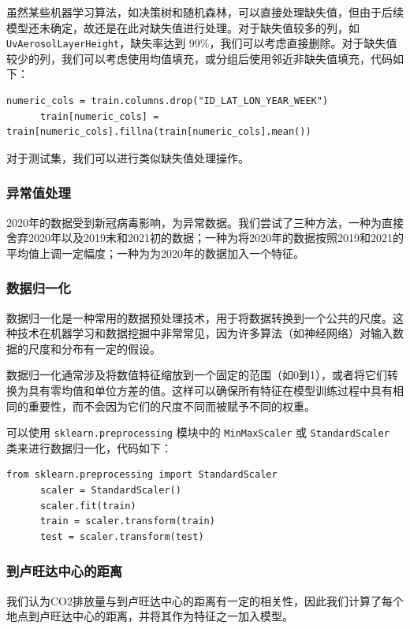 \documentclass{ctexart}
\begin{document}
虽然某些机器学习算法，如决策树和随机森林，可以直接处理缺失值，但由于后续模型还未确定，故还是在此对缺失值进行处理。对于缺失值较多的列，如 \texttt{UvAerosolLayerHeight}，缺失率达到 99\%，我们可以考虑直接删除。对于缺失值较少的列，我们可以考虑使用均值填充，或分组后使用邻近非缺失值填充，代码如下：

\begin{lstlisting}[style=Python]
      numeric_cols = train.columns.drop("ID_LAT_LON_YEAR_WEEK")
      train[numeric_cols] = train[numeric_cols].fillna(train[numeric_cols].mean())
\end{lstlisting}

对于测试集，我们可以进行类似缺失值处理操作。

\subsubsection{异常值处理}
2020年的数据受到新冠病毒影响，为异常数据。我们尝试了三种方法，一种为直接舍弃2020年以及2019末和2021初的数据；一种为将2020年的数据按照2019和2021的平均值上调一定幅度；一种为为2020年的数据加入一个特征。

\subsubsection{数据归一化}

数据归一化是一种常用的数据预处理技术，用于将数据转换到一个公共的尺度。这种技术在机器学习和数据挖掘中非常常见，因为许多算法（如神经网络）对输入数据的尺度和分布有一定的假设。

数据归一化通常涉及将数值特征缩放到一个固定的范围（如0到1），或者将它们转换为具有零均值和单位方差的值。这样可以确保所有特征在模型训练过程中具有相同的重要性，而不会因为它们的尺度不同而被赋予不同的权重。

可以使用 \texttt{sklearn.preprocessing} 模块中的 \texttt{MinMaxScaler} 或 \texttt{StandardScaler} 类来进行数据归一化，代码如下：

\begin{lstlisting}[style=Python]
      from sklearn.preprocessing import StandardScaler
      scaler = StandardScaler()
      scaler.fit(train)
      train = scaler.transform(train)
      test = scaler.transform(test)
\end{lstlisting}

\subsubsection{到卢旺达中心的距离}
我们认为CO2排放量与到卢旺达中心的距离有一定的相关性，因此我们计算了每个地点到卢旺达中心的距离，并将其作为特征之一加入模型。
\end{document}
